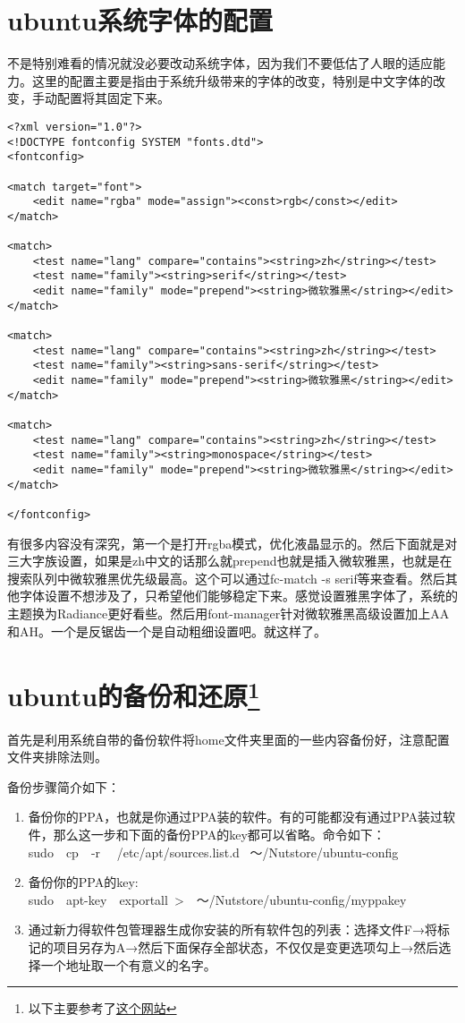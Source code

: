 \section{ubuntu系统字体的配置}
不是特别难看的情况就没必要改动系统字体，因为我们不要低估了人眼的适应能力。这里的配置主要是指由于系统升级带来的字体的改变，特别是中文字体的改变，手动配置将其固定下来。
\begin{verbatim}
<?xml version="1.0"?>
<!DOCTYPE fontconfig SYSTEM "fonts.dtd">
<fontconfig>

<match target="font">
	<edit name="rgba" mode="assign"><const>rgb</const></edit>
</match>

<match>
	<test name="lang" compare="contains"><string>zh</string></test>
	<test name="family"><string>serif</string></test>
	<edit name="family" mode="prepend"><string>微软雅黑</string></edit>
</match>

<match>
	<test name="lang" compare="contains"><string>zh</string></test>
	<test name="family"><string>sans-serif</string></test>
	<edit name="family" mode="prepend"><string>微软雅黑</string></edit>
</match>

<match>
	<test name="lang" compare="contains"><string>zh</string></test>
	<test name="family"><string>monospace</string></test>
	<edit name="family" mode="prepend"><string>微软雅黑</string></edit>
</match>	

</fontconfig>
\end{verbatim}
有很多内容没有深究，第一个是打开rgba模式，优化液晶显示的。然后下面就是对三大字族设置，如果是zh中文的话那么就prepend也就是插入微软雅黑，也就是在搜索队列中微软雅黑优先级最高。这个可以通过fc-match  -s  serif等来查看。然后其他字体设置不想涉及了，只希望他们能够稳定下来。感觉设置雅黑字体了，系统的主题换为Radiance更好看些。然后用font-manager针对微软雅黑高级设置加上AA和AH。一个是反锯齿一个是自动粗细设置吧。就这样了。


\section[ubuntu的备份和还原]{ubuntu的备份和还原\footnote{以下主要参考了\href{http://www.matthartley.com/how-to-backup-your-ubuntu-software/}{这个网站}}}
首先是利用系统自带的备份软件将home文件夹里面的一些内容备份好，注意配置文件夹排除法则。

备份步骤简介如下：
\begin{enumerate}
\item 备份你的PPA，也就是你通过PPA装的软件。有的可能都没有通过PPA装过软件，那么这一步和下面的备份PPA的key都可以省略。命令如下：\\
sudo~~cp~~-r ~~/etc/apt/sources.list.d~ ～/Nutstore/ubuntu-config
\item 备份你的PPA的key:\\
sudo~~apt-key~~exportall~>~~～/Nutstore/ubuntu-config/myppakey
\item 通过新力得软件包管理器生成你安装的所有软件包的列表：选择文件F→将标记的项目另存为A→然后下面保存全部状态，不仅仅是变更选项勾上→然后选择一个地址取一个有意义的名字。
\end{enumerate}

